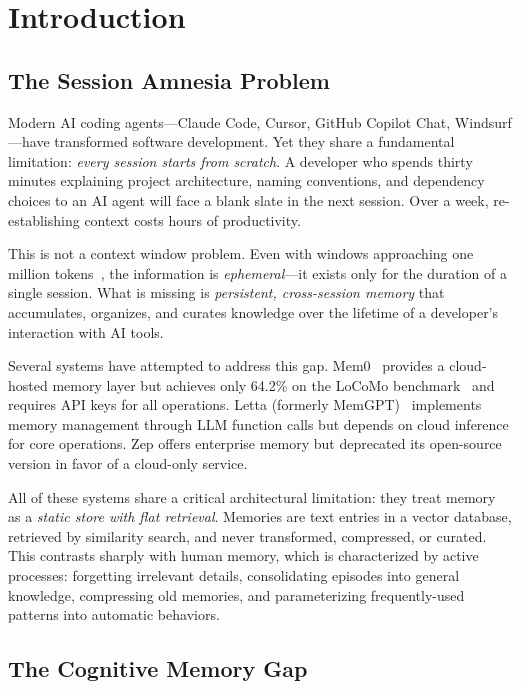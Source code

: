 \section{Introduction}

\subsection{The Session Amnesia Problem}

Modern AI coding agents---Claude Code, Cursor, GitHub Copilot Chat, Windsurf---have transformed software development. Yet they share a fundamental limitation: \emph{every session starts from scratch}. A developer who spends thirty minutes explaining project architecture, naming conventions, and dependency choices to an AI agent will face a blank slate in the next session. Over a week, re-establishing context costs hours of productivity.

This is not a context window problem. Even with windows approaching one million tokens~\cite{gemini-1m}, the information is \emph{ephemeral}---it exists only for the duration of a single session. What is missing is \emph{persistent, cross-session memory} that accumulates, organizes, and curates knowledge over the lifetime of a developer's interaction with AI tools.

Several systems have attempted to address this gap. Mem0~\cite{mem0} provides a cloud-hosted memory layer but achieves only 64.2\% on the LoCoMo benchmark~\cite{locomo} and requires API keys for all operations. Letta (formerly MemGPT)~\cite{letta} implements memory management through LLM function calls but depends on cloud inference for core operations. Zep offers enterprise memory but deprecated its open-source version in favor of a cloud-only service.

All of these systems share a critical architectural limitation: they treat memory as a \emph{static store with flat retrieval}. Memories are text entries in a vector database, retrieved by similarity search, and never transformed, compressed, or curated. This contrasts sharply with human memory, which is characterized by active processes: forgetting irrelevant details, consolidating episodes into general knowledge, compressing old memories, and parameterizing frequently-used patterns into automatic behaviors.

\subsection{The Cognitive Memory Gap}

